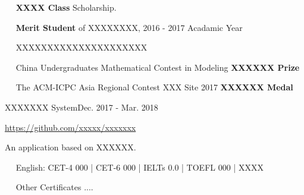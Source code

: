\documentclass{sorahjy_cv}
\begin{document}
%
%

\begin{description}{}
	\item{\ \ } \textbf{XXXX Class} Scholarship.
	\item{\ \ } \textbf{Merit Student} of XXXXXXXX, 2016 - 2017 Acadamic Year
	\item{\ \ } XXXXXXXXXXXXXXXXXXXXX
	\item{\ \ } China Undergraduates Mathematical Contest in Modeling \hfill \textbf{XXXXXX Prize}
	\item{\ \ } The ACM-ICPC Asia Regional Contest XXX Site 2017 \hfill \textbf{XXXXXX Medal}
\end{description}


%
%


\begin{sectionContentSimple}{XXXXXXX System}{Dec. 2017 - Mar. 2018}
	\item \url{https://github.com/xxxxx/xxxxxxx}
	\item An application based on XXXXXX.
\end{sectionContentSimple}


%
%



%
%
\begin{description}{}
	\item{\ \ } English: CET-4 000 | CET-6 000 | IELTs 0.0 | TOEFL 000 | XXXX
	\item{\ \ } Other Certificates ....
\end{description}




%
%

\end{document}
